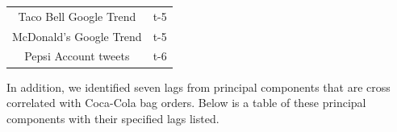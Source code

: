 \documentclass[12pt,oneside]{chicagocapstone}
\begin{document}
\begin{longtable}[]{@{}cc@{}}
\begin{minipage}[t]{0.44\columnwidth}\centering
Taco Bell Google Trend\strut
\end{minipage} & \begin{minipage}[t]{0.39\columnwidth}\centering
t-5\strut
\end{minipage}\tabularnewline
\begin{minipage}[t]{0.44\columnwidth}\centering
McDonald's Google Trend\strut
\end{minipage} & \begin{minipage}[t]{0.39\columnwidth}\centering
t-5\strut
\end{minipage}\tabularnewline
\begin{minipage}[t]{0.44\columnwidth}\centering
Pepsi Account tweets\strut
\end{minipage} & \begin{minipage}[t]{0.39\columnwidth}\centering
t-6\strut
\end{minipage}\tabularnewline
\bottomrule
\end{longtable}
In addition, we identified seven lags from principal components that are cross correlated with Coca-Cola bag orders. Below is a table of these principal components with their specified lags listed.
\end{document}
